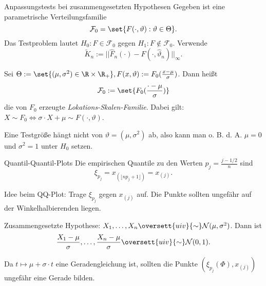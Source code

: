 \begin{karte}{Anpassungstests bei zusammengesetzten Hypothesen}
Gegeben ist eine parametrische Verteilungsfamilie 
\[ \mathcal{F}_0 = \set{F(\cdot, \vartheta): \vartheta \in \Theta}. \]
Das Testproblem lautet \(H_0: F\in \mathcal{F}_0\) gegen \(H_1: F\notin \mathcal{F}_0\).
Verwende 
\[ \tilde{K}_n := ||\hat{F}_n(\cdot) - F(\cdot, \hat{\vartheta}_n)||_\infty. \]

Sei \(\Theta := \set{(\mu, \sigma^2) \in \R\times \R_+}, F(x,\vartheta) := F_0(\frac{x-\mu}{\sigma})\).
Dann heißt 
\[ \mathcal{F}_0 := \set{F_0(\frac{\cdot - \mu}{\sigma})} \]
die von \(F_0\) erzeugte \textit{Lokations-Skalen-Familie}. 
Dabei gilt: \(X\sim F_0 \Leftrightarrow \sigma \cdot X + \mu \sim F(\cdot, \vartheta)\).

Eine Testgröße hängt nicht von \(\vartheta = (\mu, \sigma^2)\) ab, also kann man 
o. B. d. A. \(\mu=0\) und \(\sigma^2 = 1\) unter \(H_0\) setzen.
\end{karte}

\begin{karte}{Quantil-Quantil-Plots}
Die empirischen Quantile zu den Werten \(p_j = \frac{j - 1/2}{n}\)
sind 
\[ \xi_{p_j} = x_{(\lfloor np_j + 1\rfloor)} = x_{(j)}. \]

Idee beim QQ-Plot: 
Trage \(\xi_{p_j}\) gegen \(x_{(j)}\) auf. Die Punkte sollten ungefähr auf der Winkelhalbierenden liegen.

Zusammengesetzte Hypothese: \(X_1, \ldots, X_n \oversett{uiv}{\sim} \mathcal{N}(\mu, \sigma^2)\). 
Dann ist \[ \frac{X_1-\mu}{\sigma}, \ldots, \frac{X_n-\mu}{\sigma} \oversett{uiv}{\sim} \mathcal{N}(0,1). \]

Da \(t\mapsto \mu + \sigma \cdot t\) eine Geradengleichung ist, sollten die Punkte 
\((\xi_{p_j}(\Phi), x_{(j)})\) ungefähr eine Gerade bilden. 
\end{karte}